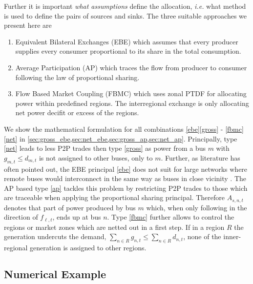 \documentclass[11pt,twocolumn]{article}
\newcommand{\ie}{\textit{i.e.} }
\newcommand{\nodalgeneration}[1][n]{g_{#1,t}}
\newcommand{\flow}{f_{\ell,t}}
\newcommand{\demand}[1][n]{d_{#1,t}}
\newcommand{\nodaldemand}[1][n]{d_{#1,t}}
\newcommand{\allocategeneration}[1][s, n]{A_{#1,t}}
\begin{document}
% 
Further it is important \textit{what assumptions} define the allocation, \ie what method is used to define the pairs of sources and sinks. The three suitable approaches we present here are
% 
\begin{enumerate}[label=\alph*., ref=\alph*]
\item Equivalent Bilateral Exchanges (EBE) \cite{galiana_transmission_2003} which assumes
that every producer supplies every consumer proportional to its share in the total consumption. \label{ebe} 
\item Average Participation (AP) \cite{bialek_tracing_1996,achayuthakan_electricity_2010-1} which traces the flow from producer to consumer following the law of proportional sharing. \label{ap}
\item Flow Based Market Coupling (FBMC) which uses zonal PTDF for allocating power within predefined regions. The interregional exchange is only allocating net power decifit or excess of the regions. \label{fbmc}
\end{enumerate}
% 
We show the mathematical formulation for all combinations \ref{ebe}\ref{gross} - \ref{fbmc}\ref{net} in \cref{sec:gross_ebe,sec:net_ebe,sec:gross_ap,sec:net_ap}.
% 
Principally, type \ref{net} leads to less P2P trades then type \ref{gross} as power from a bus $m$ with $\nodalgeneration[m] \le \nodaldemand[m]$ is not assigned to other buses, only to $m$. 
Further, as literature has often pointed out, the EBE principal \ref{ebe} does not suit for large networks where remote buses would interconnect in the same way as buses in close vicinity \cite{gil_multiarea_2005}. The AP based type \ref{ap} tackles this problem by restricting P2P trades to those which are traceable when applying the proportional sharing principal. Therefore $\allocategeneration$ denotes that part of power produced by bus $m$ which, when only following in the direction of $\flow$, ends up at bus $n$. Type \ref{fbmc} further allows to control the regions or market zones which are netted out in a first step. If in a region $R$ the generation undercuts the demand, $\sum_{n \in R} \nodalgeneration \le \sum_{n \in R} \demand$, none of the inner-regional generation is assigned to other regions. 



\subsection{Numerical Example}
\label{sec:numerical_example}
\end{document}
